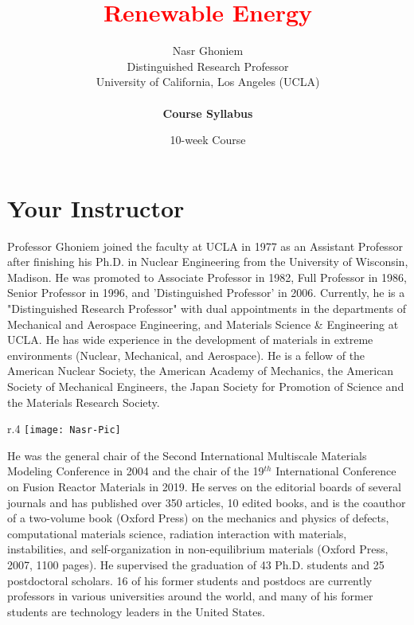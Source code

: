 \documentclass[11pt]{article}
\title{{\Huge\textcolor{red}{Renewable Energy}}}
\author{Nasr Ghoniem\\Distinguished Research Professor\\University of California, Los Angeles (UCLA)\\~ \\\textbf{Course Syllabus}}
\date{10-week Course}
\begin{document}
\maketitle
\tableofcontents
\newpage
\section{Your Instructor}
Professor Ghoniem joined the faculty at UCLA in 1977 as an Assistant Professor after finishing his
Ph.D. in Nuclear Engineering from the University of Wisconsin, Madison. He was promoted to
Associate Professor in 1982, Full Professor in 1986, Senior Professor in 1996, and 'Distinguished Professor' in 2006. Currently, he is a "Distinguished Research Professor" with dual appointments in the departments of Mechanical and Aerospace Engineering, and Materials Science \& Engineering at UCLA. He has wide experience in the development of materials in extreme environments (Nuclear, Mechanical, and Aerospace). He is a fellow of the American Nuclear Society, the American Academy of Mechanics, the American Society of Mechanical Engineers, the Japan Society for Promotion of Science and the Materials Research Society.
\begin{wrapfigure}{r}{.4\textwidth}
	\texttt{[image: Nasr-Pic]}
\end{wrapfigure}

He was the general chair of the Second International Multiscale Materials Modeling Conference in 2004 and the chair of the 19$^{th}$ International Conference on Fusion Reactor Materials in 2019.  He serves on the editorial boards of several journals and has published over 350 articles, 10 edited books, and is the coauthor of a two-volume book (Oxford Press) on the mechanics and physics of defects, computational materials science, radiation interaction with materials, instabilities, and self-organization in non-equilibrium materials (Oxford Press, 2007, 1100 pages).  He supervised the graduation of 43 Ph.D. students and 25 postdoctoral scholars. 16 of his former students and postdocs are currently professors in various universities around the world, and many of his former students are technology leaders in the United States. 
\end{document}
